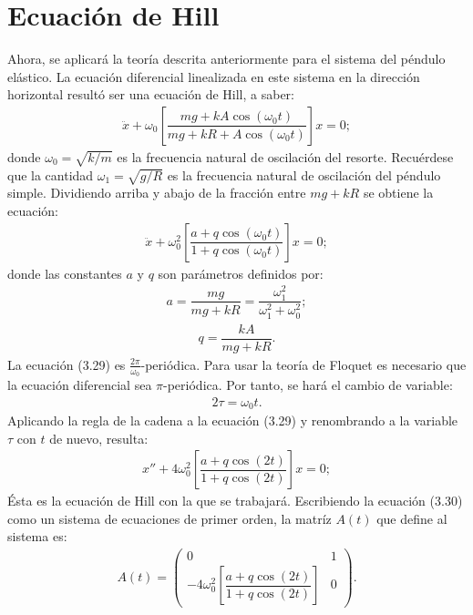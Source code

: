 \section{Ecuación de Hill}
Ahora, se aplicará la teoría descrita anteriormente para el sistema del péndulo elástico. La ecuación diferencial linealizada en este sistema en la dirección horizontal resultó ser una ecuación de Hill, a saber:
\begin{eqnarray}
\ddot{x}+\omega_{0}\left[ \dfrac{mg+kA\cos (\omega_{0}t)}{mg+kR+A\cos (\omega_{0}t)}\right] x=0;
\end{eqnarray}
donde $\omega_{0}=\sqrt{k/m}$ es la frecuencia natural de oscilación del resorte. Recuérdese que la cantidad $\omega_{1}=\sqrt{g/R}$ es la frecuencia natural de oscilación del péndulo simple. Dividiendo arriba y abajo de la fracción entre $mg+kR$ se obtiene la ecuación:
\begin{eqnarray}
\ddot{x}+\omega_{0}^{2}\left[ \dfrac{a+q\cos (\omega_{0}t)}{1+q\cos (\omega_{0}t)}\right] x=0;
\end{eqnarray}
donde las constantes $a$ y $q$ son parámetros definidos por:
\begin{eqnarray*}
a=\dfrac{mg}{mg+kR}=\dfrac{\omega_{1}^{2}}{\omega_{1}^{2}+\omega_{0}^{2}};
\end{eqnarray*} 
\begin{eqnarray*}
q=\dfrac{kA}{mg+kR}.
\end{eqnarray*}
La ecuación (3.29) es $\frac{2\pi}{\omega_{0}}$-periódica. Para usar la teoría de Floquet es necesario que la ecuación diferencial sea $\pi$-periódica. Por tanto, se hará el cambio de variable:
\begin{eqnarray*}
2\tau=\omega_{0}t.
\end{eqnarray*}
Aplicando la regla de la cadena a la ecuación (3.29) y renombrando a la variable $\tau$ con $t$ de nuevo, resulta:
\begin{eqnarray}
x''+4\omega_{0}^{2}\left[ \dfrac{a+q\cos (2t)}{1+q\cos (2t)}\right] x=0;
\end{eqnarray}
Ésta es la ecuación de Hill con la que se trabajará. Escribiendo la ecuación (3.30) como un sistema de ecuaciones de primer orden, la matríz $A(t)$ que define al sistema es:
\begin{eqnarray*}
A(t)=\begin{pmatrix} 0 & 1 \\ -4\omega_{0}^{2}\left[ \dfrac{a+q\cos (2t)}{1+q\cos (2t)}\right] & 0 \end{pmatrix}.
\end{eqnarray*}
